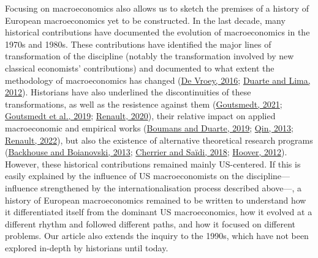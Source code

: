 \documentclass[
]{article}
\begin{document}
Focusing on macroeconomics also allows us to sketch the premises of a
history of European macroeconomics yet to be constructed. In the last
decade, many historical contributions have documented the evolution of
macroeconomics in the 1970s and 1980s. These contributions have
identified the major lines of transformation of the discipline (notably
the transformation involved by new classical economists' contributions)
and documented to what extent the methodology of macroeconomics has
changed (\protect\hyperlink{ref-devroey2016}{De Vroey, 2016};
\protect\hyperlink{ref-duartelima2012a}{Duarte and Lima, 2012}).
Historians have also underlined the discontinuities of these
transformations, as well as the resistence against them
(\protect\hyperlink{ref-goutsmedt2021b}{Goutsmedt, 2021};
\protect\hyperlink{ref-goutsmedtetal2019}{Goutsmedt et al., 2019};
\protect\hyperlink{ref-renault2020a}{Renault, 2020}), their relative
impact on applied macroeconomic and empirical works
(\protect\hyperlink{ref-boumans2019}{Boumans and Duarte, 2019};
\protect\hyperlink{ref-qin2013a}{Qin, 2013};
\protect\hyperlink{ref-renault2022}{Renault, 2022}), but also the
existence of alternative theoretical research programs
(\protect\hyperlink{ref-backhouseboianovski2013}{Backhouse and
Boianovski, 2013}; \protect\hyperlink{ref-cherrier2018c}{Cherrier and
Saïdi, 2018}; \protect\hyperlink{ref-hoover2012}{Hoover, 2012}).
However, these historical contributions remained mainly US-centered. If
this is easily explained by the influence of US macroeconomists on the
discipline---influence strengthened by the internationalisation process
described above---, a history of European macroeconomics remained to be
written to understand how it differentiated itself from the dominant US
macroeconomics, how it evolved at a different rhythm and followed
different paths, and how it focused on different problems. Our article
also extends the inquiry to the 1990s, which have not been explored
in-depth by historians until today.
\end{document}
